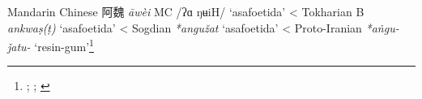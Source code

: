 \begin{etymology}\label{ety:awei}
Mandarin Chinese {阿魏} \textit{āwèi} \gls{MC} /ʔɑ ŋʉiH/ `asafoetida'
< Tokharian B \textit{ankwaṣ(ṭ)} `asafoetida'
< Sogdian \textit{*angužat} `asafoetida'
< Proto-Iranian \textit{*aṅgu-ǰatu-} `resin-gum'\footnote{\textcite{leung_itinerary_2019}; \textcite[353]{laufer_sino-iranica_1919}; \textcite[438]{tremblay_irano-tocharica_2005}}
\end{etymology}